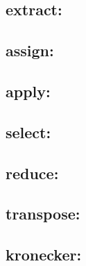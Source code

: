 \subsection{{\sf extract}: }

\subsection{{\sf assign}: }

\subsection{{\sf apply}: }

\subsection{{\sf select}: }

\subsection{{\sf reduce}: }

\subsection{{\sf transpose}: }

\subsection{{\sf kronecker}: }
